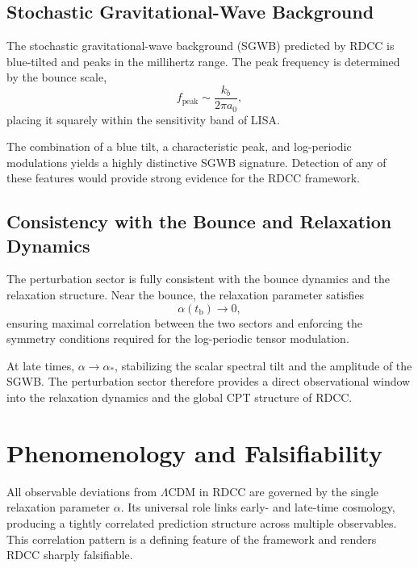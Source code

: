 \documentclass[11pt,a4paper]{article}
\begin{document}
\subsection{Stochastic Gravitational-Wave Background}

The stochastic gravitational-wave background (SGWB) predicted by RDCC is
blue-tilted and peaks in the millihertz range. The peak frequency is determined
by the bounce scale,
\begin{equation}
    f_{\mathrm{peak}} \sim \frac{k_{b}}{2\pi a_{0}},
\end{equation}
placing it squarely within the sensitivity band of LISA.

The combination of a blue tilt, a characteristic peak, and log-periodic
modulations yields a highly distinctive SGWB signature. Detection of any of
these features would provide strong evidence for the RDCC framework.

\subsection{Consistency with the Bounce and Relaxation Dynamics}

The perturbation sector is fully consistent with the bounce dynamics and the
relaxation structure. Near the bounce, the relaxation parameter satisfies
\begin{equation}
    \alpha(t_{\mathrm{b}}) \to 0,
\end{equation}
ensuring maximal correlation between the two sectors and enforcing the symmetry
conditions required for the log-periodic tensor modulation.

At late times, \(\alpha \to \alpha_{*}\), stabilizing the scalar spectral tilt and
the amplitude of the SGWB. The perturbation sector therefore provides a direct
observational window into the relaxation dynamics and the global CPT structure
of RDCC.

\section{Phenomenology and Falsifiability}

All observable deviations from $\Lambda$CDM in RDCC are governed by the single
relaxation parameter $\alpha$. Its universal role links early- and late-time
cosmology, producing a tightly correlated prediction structure across multiple
observables. This correlation pattern is a defining feature of the framework and
renders RDCC sharply falsifiable.
\end{document}
